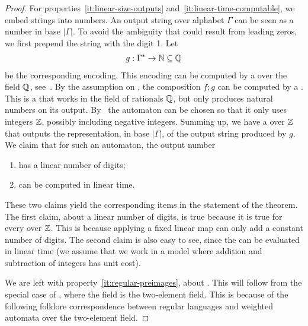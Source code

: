 \begin{proof}
    For properties~\ref{it:linear-size-outputs}
    and~\ref{it:linear-time-computable}, we embed strings into numbers. An
    output string over alphabet $\Gamma$ can be seen as a number in base
    $|\Gamma|$. To avoid the ambiguity that could result from leading zeros, we
    first prepend the string with the digit 1. Let 
    \begin{align*}
    g : \Gamma^* \to {\mathbb N} \subseteq {\mathbb Q}
    \end{align*} 
    be the corresponding encoding. This encoding can be computed by a  over the field ${\mathbb Q}$, see~\cite[Lemma 8.10]{bojanczyk_automata_2025}.
    By the assumption on , the
    composition $f;g$ can be computed by a . This is a
     that works in the field of rationals ${\mathbb Q}$, but  only
    produces natural numbers on its output. By~\cite[p.
    110]{BerstelReutenauer08} the automaton can be chosen so that it only uses
    integers ${\mathbb Z}$, possibly including negative integers. Summing up, we have
    a  over ${\mathbb Z}$ that outputs the representation, in base
    $|\Gamma|$, of the output string produced by $g$. We claim that for such an
    automaton, the output number
    \begin{enumerate}
        \item has a linear number of digits;
        \item can be computed in linear time.
    \end{enumerate}
    These two claims yield the corresponding items in the statement of the
    theorem. The first claim, about a linear number of digits, is true because
    it is true for every  over ${\mathbb Z}$. This is because
    applying a fixed linear map can only add a constant number of digits. The
    second claim is also easy to see, since the  can be
    evaluated in linear time (we assume that we work in a model where addition
    and subtraction of integers has unit cost). 

    We are left with property~\ref{it:regular-preimages}, about . This will follow from the special case of ,
    where the field is the two-element field.  This is because of  the
    following  folklore correspondence between regular languages and weighted
    automata over the two-element field. 
        

\end{proof}

